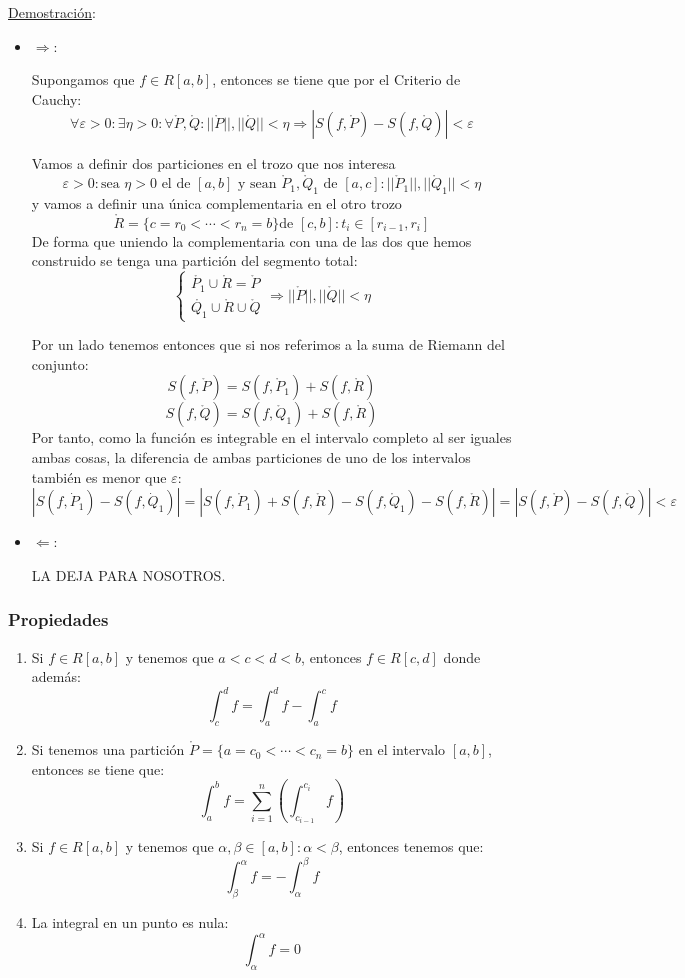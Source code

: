 \documentclass[10pt,a4paper,openright]{book}
\begin{document}
\underline{Demostración}:
\begin{itemize}
\item $\Rightarrow$:

Supongamos que $f\in R[a,b]$, entonces se tiene que por el Criterio de Cauchy:
$$\forall \varepsilon >0:  \exists \eta > 0 : \forall \mathring{P}, \mathring{Q}:  ||\mathring{P} || , ||\mathring{Q} || < \eta \Rightarrow |S(f,\mathring{P}) - S(f,\mathring{Q})| < \varepsilon $$ 

Vamos a definir dos particiones en el trozo que nos interesa
$$\varepsilon > 0: \mbox{sea }\eta > 0\mbox{ el de }[a,b] \mbox{ y sean }\mathring{P}_1, \mathring{Q}_1\mbox{ de }[a,c]: ||\mathring{P}_1 || , ||\mathring{Q}_1 || < \eta$$
y vamos a definir una única complementaria en el otro trozo
$$\mathring{R} = \{c = r_0 < \cdots < r_n = b\}\mbox{de }[c,b]: t_i \in [r_{i-1}, r_i]$$
De forma que uniendo la complementaria con una de las dos que hemos construido se tenga una partición del segmento total:
$$\begin{cases} \mathring{P_1}\cup \mathring{R} = \mathring{P} \\ \mathring{Q_1}\cup \mathring{R} \cup \mathring{Q} \end{cases}\Rightarrow ||\mathring{P}||, ||\mathring{Q}||<\eta$$

Por un lado tenemos entonces que si nos referimos a la suma de Riemann del conjunto:
$$S(f,\mathring{P}) = S(f,\mathring{P}_1) + S(f,\mathring{R})$$
$$S(f,\mathring{Q}) = S(f,\mathring{Q}_1) + S(f,\mathring{R})$$
Por tanto, como la función es integrable en el intervalo completo al ser iguales ambas cosas, la diferencia de ambas particiones de uno de los intervalos también es menor que $\varepsilon$:
$$|S(f,\dot{P}_1) - S(f,\dot{Q}_1)|= |S(f,\mathring{P}_1) + S(f,\mathring{R}) - S(f,\mathring{Q}_1) - S(f,\mathring{R})| = |S(f,\mathring{P}) - S(f,\mathring{Q})| < \varepsilon$$

\item $\Leftarrow$: 

LA DEJA PARA NOSOTROS.
\end{itemize}

\subsubsection*{Propiedades}
\begin{enumerate}
\item Si $f\in R[a,b]$ y tenemos que $a<c<d<b$, entonces $f\in R[c,d]$ donde además:
$$\int_{c}^{d} f = \int_{a}^{d} f - \int_{a}^{c} f$$

\item Si tenemos una partición $\mathring{P} = \{a = c_0 < \cdots < c_n = b\}$ en el intervalo $[a,b]$, entonces se tiene que:
$$\int_{a}^{b} f = \sum_{i = 1}^{n} \left(\int_{c_{i-1}}^{c_i} f\right)$$

\item Si $f\in R[a,b]$ y tenemos que $\alpha,\beta\in [a,b]: \alpha < \beta$, entonces tenemos que:
$$\int_{\beta}^{\alpha} f {=} - \int_{\alpha}^{\beta} f$$
\item La integral en un punto es nula:
$$\int_{\alpha}^{\alpha} f = 0$$
\end{enumerate}
\end{document}
